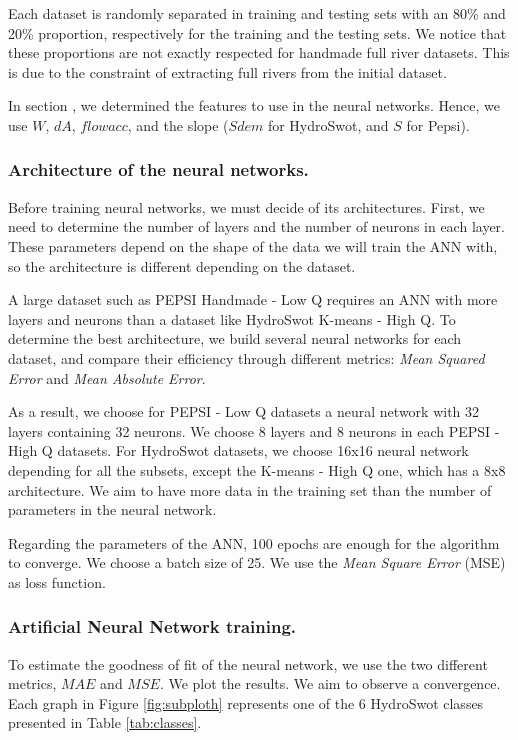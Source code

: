 Each dataset is randomly separated in training and testing sets with an 80\% and 20\% proportion, respectively for the training and the testing sets. We notice that these proportions are not exactly respected for handmade full river datasets. This is due to the constraint of extracting full rivers from the initial dataset. 

In section , we determined the features to use in the neural networks. Hence, we use $W$, $dA$, $flowacc$, and the slope ($Sdem$ for HydroSwot, and $S$ for Pepsi). 

\subsubsection{Architecture of the neural networks.}

Before training neural networks, we must decide of its architectures. First, we need to determine the number of layers and the number of neurons in each layer. These parameters depend on the shape of the data we will train the ANN with, so the architecture is different depending on the dataset. 

A large dataset such as PEPSI Handmade - Low Q requires an ANN with more layers and neurons than a dataset like HydroSwot K-means - High Q. To determine the best architecture, we build several neural networks for each dataset, and compare their efficiency through different metrics: \textit{Mean Squared Error} and \textit{Mean Absolute Error}.

As a result, we choose for PEPSI - Low Q datasets a neural network with 32 layers containing 32 neurons. We choose 8 layers and 8 neurons in each PEPSI - High Q datasets. For HydroSwot datasets, we choose 16x16 neural network depending for all the subsets, except the K-means - High Q one, which has a 8x8 architecture. We aim to have more data in the training set than the number of parameters in the neural network.

Regarding the parameters of the ANN, 100 epochs are enough for the algorithm to converge. We choose a batch size of 25. We use the \textit{Mean Square Error} (MSE) as loss function. 

\subsubsection{Artificial Neural Network training.}

To estimate the goodness of fit of the neural network, we use the two different metrics, $MAE$ and $MSE$. We plot the results. We aim to observe a convergence.  Each graph in Figure \ref{fig:subploth} represents one of the 6 HydroSwot classes presented in Table \ref{tab:classes}.

